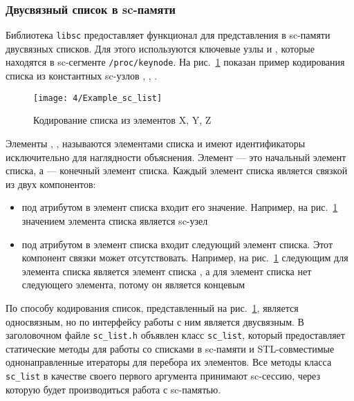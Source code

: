 \subsubsection{Двусвязный список в sc-памяти}
\label{sec:libsc_sc_list}

Библиотека \texttt{libsc} предоставляет функционал для представления в
sc-памяти двусвязных списков. Для этого используются ключевые узлы
 и , которые находятся в
sc-сегменте \verb|/proc/keynode|. На рис.~\ref{fig:Example_sc_list}
показан пример кодирования списка из константных sc-узлов ,
, .

\begin{figure}
  \centering
  \texttt{[image: 4/Example\_sc\_list]}
  \caption{Кодирование списка из элементов X, Y, Z}
  \label{fig:Example_sc_list}
\end{figure}

Элементы , ,  называются элементами списка
и имеют идентификаторы исключительно для наглядности
объяснения. Элемент  --- это начальный элемент списка, а
 --- конечный элемент списка. Каждый элемент списка является
связкой из двух компонентов:

\begin{itemize}
\item под атрибутом  в элемент списка входит его
  значение. Например, на рис.~\ref{fig:Example_sc_list} значением
  элемента списка  является sc-узел 
\item под атрибутом  в элемент списка входит
  следующий элемент списка. Этот компонент связки может
  отсутствовать. Например, на рис.~\ref{fig:Example_sc_list} следующим
  для элемента списка  является элемент списка , а
  для элемент списка  нет следующего элемента, потому он
  является концевым
\end{itemize}

По способу кодирования список, представленный на
рис.~\ref{fig:Example_sc_list}, является односвязным, но по интерфейсу
работы с ним является двусвязным. В заголовочном файле
\verb|sc_list.h| объявлен класс \lstinline|sc_list|, который
предоставляет статические методы для работы со списками в sc-памяти и
STL-совместимые однонаправленные итераторы для перебора их
элементов. Все методы класса \lstinline|sc_list| в качестве своего
первого аргумента принимают sc-сессию, через которую будет
производиться работа с sc-памятью.


